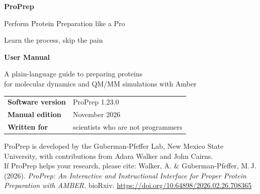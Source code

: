 \begin{titlepage}
\thispagestyle{empty}

\vspace*{8mm}
{\color{white}\sffamily\bfseries\fontsize{46}{50}\selectfont ProPrep\par}
\vspace{4mm}
{\color{white}\sffamily\Large Perform Protein Preparation like a Pro\par}
\vspace{2mm}
{\color{white!85!ppblue}\sffamily\large Learn the process, skip the pain\par}

\vspace{48mm}
{\sffamily\bfseries\Huge\color{ppblue} User Manual\par}
\vspace{4mm}
{\sffamily\Large\color{ppgrey} A plain-language guide to preparing proteins\\[2pt]
for molecular dynamics and QM/MM simulations with Amber\par}

\vspace{14mm}
\begin{tcolorbox}[colback=pplight,colframe=pplight,arc=2pt,left=10pt,right=10pt,top=8pt,bottom=8pt]
\sffamily
\begin{tabular}{@{}ll@{}}
\textbf{\color{ppblue}Software version} & ProPrep 1.23.0 \\
\textbf{\color{ppblue}Manual edition}   & November 2026 \\
\textbf{\color{ppblue}Written for}      & scientists who are not programmers \\
\end{tabular}
\end{tcolorbox}

\vfill
{\sffamily\small\color{ppgrey}
ProPrep is developed by the Guberman-Pfeffer Lab, New Mexico State University,
with contributions from Adara Walker and John Cairns.\\[3pt]
If ProPrep helps your research, please cite:
Walker, A. \& Guberman-Pfeffer, M.\,J. (2026). \emph{ProPrep: An Interactive and
Instructional Interface for Proper Protein Preparation with AMBER.} bioRxiv.
\url{https://doi.org/10.64898/2026.02.26.708365}\par}
\restoregeometry
\end{titlepage}
